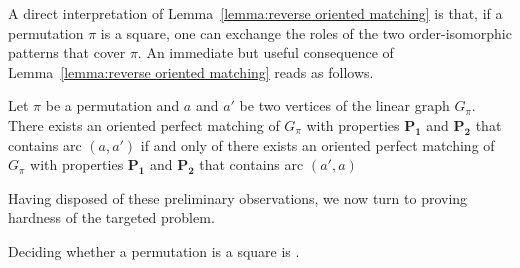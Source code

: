 \documentclass[a4paper]{llncs}
\begin{document}
A direct interpretation of Lemma~\ref{lemma:reverse oriented matching} is that,
if a permutation $\pi$ is a square, one can exchange the roles of the two
order-isomorphic patterns that cover $\pi$.
An immediate but useful consequence of Lemma~\ref{lemma:reverse oriented matching}
reads as follows.

\begin{corollary}
  \label{corollary:reverse oriented matching}
  Let $\pi$ be a permutation and $a$ and $a'$ be two vertices of
  the linear graph $G_\pi$.
  There exists an oriented perfect matching of $G_\pi$ with
  properties $\mathbf{P_1}$ and $\mathbf{P_2}$ that contains arc $(a,a')$
  if and only of
  there exists an oriented perfect matching of $G_\pi$ with
  properties $\mathbf{P_1}$ and $\mathbf{P_2}$ that contains arc $(a',a)$
\end{corollary}

Having disposed of these preliminary observations,
we now turn to proving hardness of the targeted problem.

\begin{proposition}
  \label{proposition:hardness}
  Deciding whether a permutation is a square is \NPC.
\end{proposition}
\end{document}
